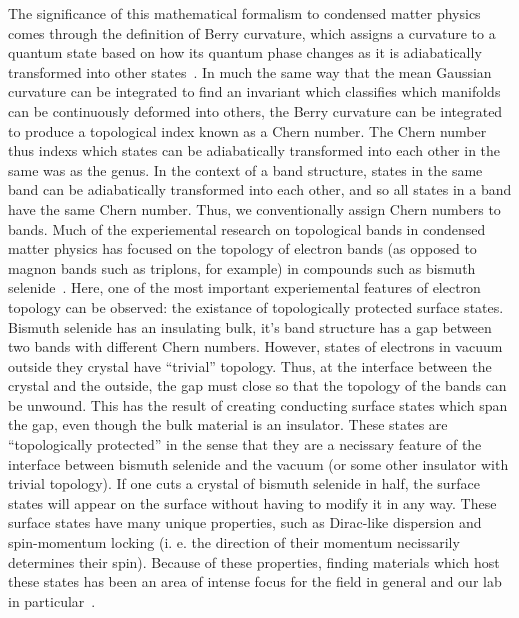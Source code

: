 \documentclass{thesis-umich}
\begin{document}
The significance of this mathematical formalism to condensed matter physics comes through the definition of Berry curvature, which assigns a curvature to a quantum state based on how its quantum phase changes as it is  adiabatically transformed into other states~\cite{Berry1984}. In much the same way that the mean Gaussian curvature can be integrated to find an invariant which classifies which manifolds can be continuously deformed into others, the Berry curvature can be integrated to produce a topological index known as a Chern number. The Chern number thus indexs which states can be adiabatically transformed into each other in the same was as the genus. In the context of a band structure, states in the same band can be adiabatically transformed into each other, and so all states in a band have the same Chern number. Thus, we conventionally assign Chern numbers to bands. Much of the experiemental research on topological bands in condensed matter physics has focused on the topology of electron bands (as opposed to magnon bands such as triplons, for example) in compounds such as bismuth selenide~\cite{Hsieh2008}. Here, one of the most important experiemental features of electron topology can be observed: the existance of topologically protected surface states. Bismuth selenide has an insulating bulk, it's band structure has a gap between two bands with different Chern numbers. However, states of electrons in vacuum outside they crystal have ``trivial'' topology. Thus, at the interface between the crystal and the outside, the gap must close so that the topology of the bands can be unwound. This has the result of creating conducting surface states which span the gap, even though the bulk material is an insulator. These states are ``topologically protected'' in the sense that they are a necissary feature of the interface between bismuth selenide and the vacuum (or some other insulator with trivial topology). If one cuts a crystal of bismuth selenide in half, the surface states will appear on the surface without having to modify it in any way. These surface states have many unique properties, such as Dirac-like dispersion and spin-momentum locking (i. e. the direction of their momentum necissarily determines their spin)\cite{Fu2007}. Because of these properties, finding materials which host these states has been an area of intense focus for the field in general and our lab in particular~\cite{Li2014}.
\end{document}
